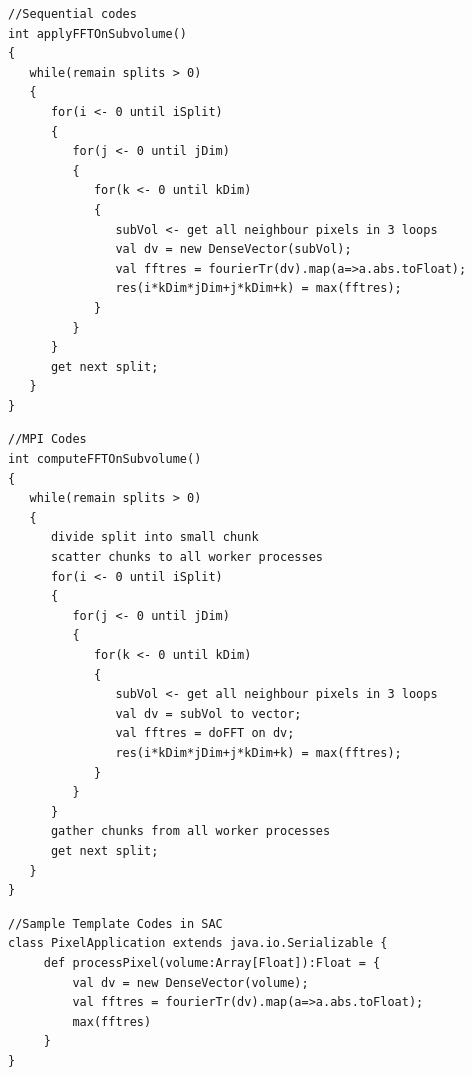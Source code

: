 \lstset{language=Java,frame=single}
\begin{lstlisting}[float,caption= Sequential Pseudo Codes of FFT on Sub-volume, label=SeqCodeFFT]
//Sequential codes
int applyFFTOnSubvolume() 
{
   while(remain splits > 0) 
   {
      for(i <- 0 until iSplit)
      {
         for(j <- 0 until jDim)
         {
            for(k <- 0 until kDim)
            {
               subVol <- get all neighbour pixels in 3 loops
               val dv = new DenseVector(subVol);
               val fftres = fourierTr(dv).map(a=>a.abs.toFloat); 
               res(i*kDim*jDim+j*kDim+k) = max(fftres);
            }
         }
      }
      get next split;
   }
}
\end{lstlisting}

\lstset{language=Java,frame=single}
\begin{lstlisting}[float,caption= Pseudo Codes of FFT on Sub-volume in MPI, label=MPICodeFFT]
//MPI Codes
int computeFFTOnSubvolume() 
{
   while(remain splits > 0) 
   {    
      divide split into small chunk
      scatter chunks to all worker processes
      for(i <- 0 until iSplit)
      {
         for(j <- 0 until jDim)
         {
            for(k <- 0 until kDim)
            {
               subVol <- get all neighbour pixels in 3 loops
               val dv = subVol to vector;
               val fftres = doFFT on dv; 
               res(i*kDim*jDim+j*kDim+k) = max(fftres);
            }
         }
      }
      gather chunks from all worker processes 
      get next split;
   }
}
\end{lstlisting}

\lstset{language=Java,frame=single}
\begin{lstlisting}[float,caption= Sample Codes of FFT on Sub-volume in Template of SAC,label=SACCodeFFT]
//Sample Template Codes in SAC
class PixelApplication extends java.io.Serializable {
     def processPixel(volume:Array[Float]):Float = {
         val dv = new DenseVector(volume);
         val fftres = fourierTr(dv).map(a=>a.abs.toFloat); 
         max(fftres)
     }
}
\end{lstlisting}


